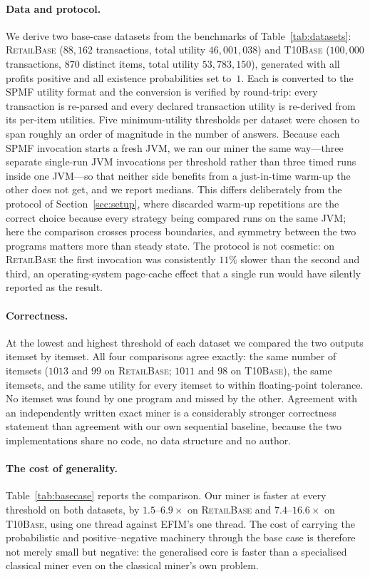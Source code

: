 \documentclass[pdflatex,sn-vancouver-num]{sn-jnl}
\theoremstyle{thmstyleone}%
\theoremstyle{thmstyletwo}%
\theoremstyle{thmstylethree}%
\begin{document}
\paragraph{Data and protocol.}
We derive two base-case datasets from the benchmarks of
Table~\ref{tab:datasets}: \textsc{RetailBase} ($88{,}162$ transactions,
total utility $46{,}001{,}038$) and \textsc{T10Base} ($100{,}000$
transactions, $870$ distinct items, total utility $53{,}783{,}150$),
generated with all profits positive and all existence probabilities set
to~$1$. Each is converted to the SPMF utility format and the conversion
is verified by round-trip: every transaction is re-parsed and every
declared transaction utility is re-derived from its per-item utilities.
Five minimum-utility thresholds per dataset were chosen to span roughly
an order of magnitude in the number of answers. Because each SPMF
invocation starts a fresh JVM, we ran our miner the same way---three
separate single-run JVM invocations per threshold rather than three
timed runs inside one JVM---so that neither side benefits from a
just-in-time warm-up the other does not get, and we report medians. This
differs deliberately from the protocol of Section~\ref{sec:setup},
where discarded warm-up repetitions are the correct choice because every
strategy being compared runs on the same JVM; here the comparison
crosses process boundaries, and symmetry between the two programs
matters more than steady state. The protocol is not cosmetic: on
\textsc{RetailBase} the first invocation was consistently $11\%$ slower
than the second and third, an operating-system page-cache effect that a
single run would have silently reported as the result.
 
\paragraph{Correctness.}
At the lowest and highest threshold of each dataset we compared the two
outputs itemset by itemset. All four comparisons agree exactly: the same
number of itemsets ($1013$ and $99$ on \textsc{RetailBase}; $1011$ and
$98$ on \textsc{T10Base}), the same itemsets, and the same utility for
every itemset to within floating-point tolerance. No itemset was found
by one program and missed by the other. Agreement with an independently
written exact miner is a considerably stronger correctness statement
than agreement with our own sequential baseline, because the two
implementations share no code, no data structure and no author.
 
\paragraph{The cost of generality.}
Table~\ref{tab:basecase} reports the comparison. Our miner is faster at
every threshold on both datasets, by $1.5$--$6.9\times$ on
\textsc{RetailBase} and $7.4$--$16.6\times$ on \textsc{T10Base}, using
one thread against EFIM's one thread. The cost of carrying the
probabilistic and positive--negative machinery through the base case is
therefore not merely small but negative: the generalised core is faster
than a specialised classical miner even on the classical miner's own
problem.
 
\end{document}
